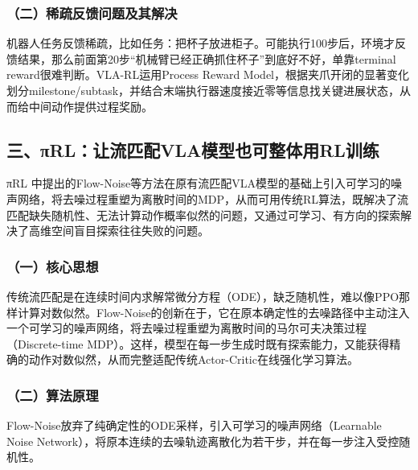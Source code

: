 \hypertarget{ux4e8cux7a00ux758fux53cdux9988ux95eeux9898ux53caux5176ux89e3ux51b3}{%
\subsubsection{（二）稀疏反馈问题及其解决}\label{ux4e8cux7a00ux758fux53cdux9988ux95eeux9898ux53caux5176ux89e3ux51b3}}

机器人任务反馈稀疏，比如任务：把杯子放进柜子。可能执行100步后，环境才反馈结果，那么前面第20步``机械臂已经正确抓住杯子''到底好不好，单靠terminal reward很难判断。VLA-RL运用Process Reward Model，根据夹爪开闭的显著变化划分milestone/subtask，并结合末端执行器速度接近零等信息找关键进展状态，从而给中间动作提供过程奖励。

\hypertarget{ux4e09ux3c0rlux8ba9ux6d41ux5339ux914dvlaux6a21ux578bux4e5fux53efux6574ux4f53ux7528rlux8badux7ec3}{%
\subsection{三、πRL：让流匹配VLA模型也可整体用RL训练}\label{ux4e09ux3c0rlux8ba9ux6d41ux5339ux914dvlaux6a21ux578bux4e5fux53efux6574ux4f53ux7528rlux8badux7ec3}}

πRL 中提出的Flow-Noise等方法在原有流匹配VLA模型的基础上引入可学习的噪声网络，将去噪过程重塑为离散时间的MDP，从而可用传统RL算法，既解决了流匹配缺失随机性、无法计算动作概率似然的问题，又通过可学习、有方向的探索解决了高维空间盲目探索往往失败的问题。

\hypertarget{ux4e00ux6838ux5fc3ux601dux60f3-15}{%
\subsubsection{（一）核心思想}\label{ux4e00ux6838ux5fc3ux601dux60f3-15}}

传统流匹配是在连续时间内求解常微分方程（ODE），缺乏随机性，难以像PPO那样计算对数似然。Flow-Noise的创新在于，它在原本确定性的去噪路径中主动注入一个可学习的噪声网络，将去噪过程重塑为离散时间的马尔可夫决策过程（Discrete-time MDP）。这样，模型在每一步生成时既有探索能力，又能获得精确的动作对数似然，从而完整适配传统Actor-Critic在线强化学习算法。

\hypertarget{ux4e8cux7b97ux6cd5ux539fux7406}{%
\subsubsection{（二）算法原理}\label{ux4e8cux7b97ux6cd5ux539fux7406}}

Flow-Noise放弃了纯确定性的ODE采样，引入可学习的噪声网络（Learnable Noise Network），将原本连续的去噪轨迹离散化为若干步，并在每一步注入受控随机性。

